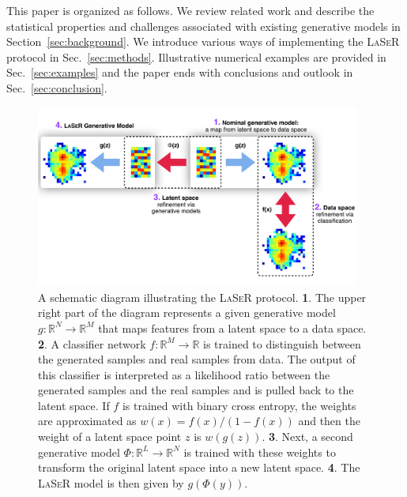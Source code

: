 This paper is organized as follows. We review related work and describe the statistical properties and challenges associated with existing generative models in Section~\ref{sec:background}.  We introduce various ways of implementing the \textsc{LaSeR} protocol in Sec.~\ref{sec:methods}.  Illustrative numerical examples are provided in Sec.~\ref{sec:examples} and the paper ends with conclusions and outlook in Sec.~\ref{sec:conclusion}.

\begin{figure}[h!]
    \centering
    \includegraphics[width=0.95\textwidth]{./figures/LSR/SchematicDiagram.pdf}
    \caption{A schematic diagram illustrating the \textsc{LaSeR} protocol.  {\large\textbf{\color{Fuchsia}1}}. The upper right part of the diagram represents a given generative model $g:\mathbb{R}^N\rightarrow \mathbb{R}^M$ that maps features from a latent space to a data space.  {\large\textbf{\color{Fuchsia}2}}. A classifier network $f:\mathbb{R}^M\rightarrow \mathbb{R}$ is trained to distinguish between the generated samples and real samples from data.  The output of this classifier is interpreted as a likelihood ratio between the generated samples and the real samples and is pulled back to the latent space.  If $f$ is trained with binary cross entropy, the weights are approximated as $w(x)=f(x)/(1-f(x))$ and then the weight of a latent space point $z$ is $w(g(z))$.  {\large\textbf{\color{Fuchsia}3}}. Next, a second generative model $\Phi:\mathbb{R}^L\rightarrow \mathbb{R}^N$ is trained with these weights to transform the original latent space into a new latent space.  {\large\textbf{\color{Fuchsia}4}}. The \textsc{LaSeR} model is then given by $g(\Phi(y))$.}
    \label{fig:schematic}
\end{figure}

